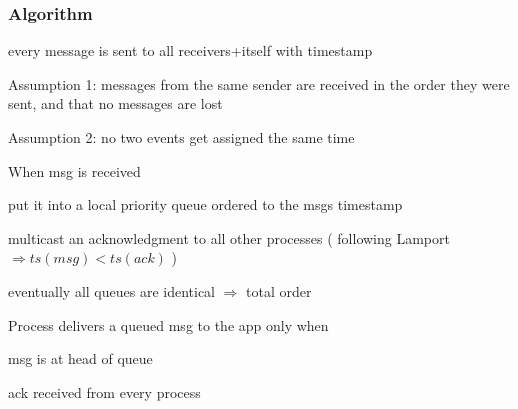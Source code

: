 \documentclass[ngerman,a4paper]{report}
\begin{document}
\subsubsection{Algorithm}
\begin{compactitem}
	\item  every message is sent to all receivers+itself with timestamp
	\item Assumption 1: messages from the same sender are received in the order they were sent, and that no messages are lost
	\item Assumption 2: no two events get assigned the same time
	\item When msg is received
	\begin{compactenum}
		\item put it into a local priority queue ordered to the msgs timestamp
		\item multicast an acknowledgment to all other processes ( following Lamport $\Rightarrow ts(msg) < ts(ack)$ )
	\end{compactenum}
	\item eventually all queues are identical $\Rightarrow$ total order
	\item Process delivers a queued msg to the app only when
	\begin{compactenum}
		\item msg is at head of queue
		\item ack received from every process
	\end{compactenum}


\end{compactitem}
\end{document}

